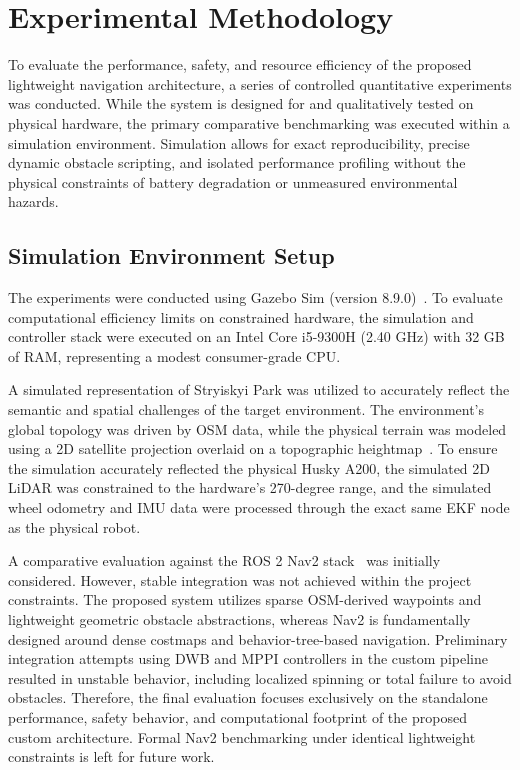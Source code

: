 \section{Experimental Methodology}
\label{sec:experimental-methodology}

To evaluate the performance, safety, and resource efficiency of the proposed lightweight navigation architecture, a series of controlled quantitative experiments was conducted. While the system is designed for and qualitatively tested on physical hardware, the primary comparative benchmarking was executed within a simulation environment. Simulation allows for exact reproducibility, precise dynamic obstacle scripting, and isolated performance profiling without the physical constraints of battery degradation or unmeasured environmental hazards.

\subsection{Simulation Environment Setup}
\label{subsec:simulation-setup}

The experiments were conducted using Gazebo Sim (version 8.9.0)~\cite{koenig2004gazebo}. To evaluate computational efficiency limits on constrained hardware, the simulation and controller stack were executed on an Intel Core i5-9300H (2.40 GHz) with 32 GB of RAM, representing a modest consumer-grade CPU.

A simulated representation of Stryiskyi Park was utilized to accurately reflect the semantic and spatial challenges of the target environment. The environment's global topology was driven by OSM data, while the physical terrain was modeled using a 2D satellite projection overlaid on a topographic heightmap~\cite{aravind_gazebo_terrain_generator}. To ensure the simulation accurately reflected the physical Husky A200, the simulated 2D LiDAR was constrained to the hardware's 270-degree range, and the simulated wheel odometry and IMU data were processed through the exact same EKF node as the physical robot.

A comparative evaluation against the ROS 2 Nav2 stack~\cite{nav2_docs} was initially considered. However, stable integration was not achieved within the project constraints. The proposed system utilizes sparse OSM-derived waypoints and lightweight geometric obstacle abstractions, whereas Nav2 is fundamentally designed around dense costmaps and behavior-tree-based navigation. Preliminary integration attempts using DWB and MPPI controllers in the custom pipeline resulted in unstable behavior, including localized spinning or total failure to avoid obstacles. Therefore, the final evaluation focuses exclusively on the standalone performance, safety behavior, and computational footprint of the proposed custom architecture. Formal Nav2 benchmarking under identical lightweight constraints is left for future work.

